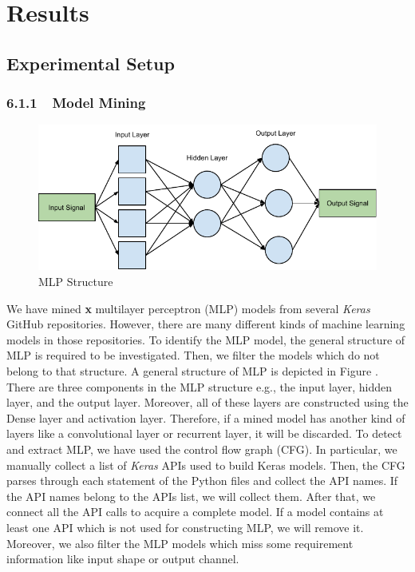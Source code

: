 \section{Results}
\label{sec:evaluation}
\subsection{Experimental Setup}
\subsubsection{\textbf{6.1.1~~Model Mining}}
\begin{figure}
	\includegraphics[width=0.8\linewidth]{mlp}
	\centering
	\caption{MLP Structure}
	\label{fig:mlp}
\end{figure}
We have mined {\bf x} multilayer perceptron (MLP) models from several \emph{Keras} GitHub repositories. However, there are many different kinds of machine learning models in those repositories. To identify the MLP model, the general structure of MLP is required to be investigated. Then, we filter the models which do not belong to that structure.  A general structure of MLP is depicted in Figure . There are three components in the MLP structure e.g., the input layer, hidden layer, and the output layer. Moreover, all of these layers are constructed using the Dense layer and activation layer. Therefore, if a mined model has another kind of layers like a convolutional layer or recurrent layer, it will be discarded. To detect and extract MLP, we have used the control flow graph (CFG). In particular, we manually collect a list of \emph{Keras} APIs used to build Keras models. Then, the CFG parses through each statement of the Python files and collect the API names. If the API names belong to the APIs list, we will collect them. After that, we connect all the API calls to acquire a complete model. If a model contains at least one API which is not used for constructing MLP, we will remove it. Moreover, we also filter the MLP models which miss some requirement information like input shape or output channel.
